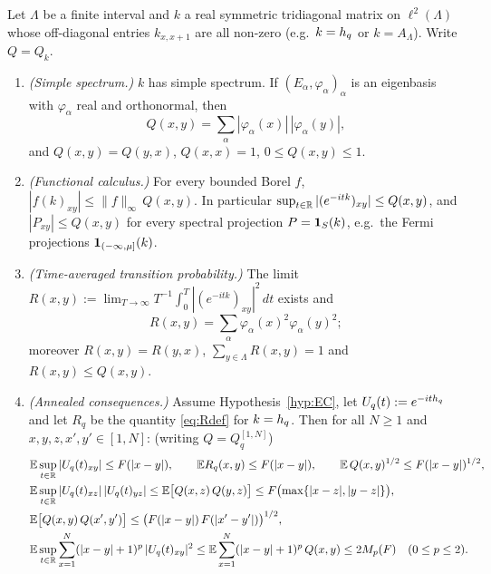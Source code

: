 \begin{lemma}\label{lem:consequences}
Let $\Lambda$ be a finite interval and $k$ a real symmetric tridiagonal matrix on $\ell^2(\Lambda)$ whose
off-diagonal entries $k_{x,x+1}$ are all non-zero (e.g.\ $k=h_{q}$ or $k=A_\Lambda$).  Write $Q=Q_k$.
\begin{enumerate}[label=(\alph*)]
\item \emph{(Simple spectrum.)} $k$ has simple spectrum.  If $(E_\alpha,\varphi_\alpha)_\alpha$ is an eigenbasis with
$\varphi_\alpha$ real and orthonormal, then
\begin{equation}\label{eq:Qsum}
  Q(x,y)=\sum_\alpha|\varphi_\alpha(x)|\,|\varphi_\alpha(y)| ,
\end{equation}
and $Q(x,y)=Q(y,x)$, $Q(x,x)=1$, $0\le Q(x,y)\le1$.
\item \emph{(Functional calculus.)} For every bounded Borel $f$, $|f(k)_{xy}|\le\|f\|_\infty\,Q(x,y)$.  In
particular $\sup_{t\in\mathbb{R}}|(e^{-itk})_{xy}|\le Q(x,y)$, and $|P_{xy}|\le Q(x,y)$ for every spectral
projection $P=\mathbf{1}_S(k)$, e.g.\ the Fermi projections $\mathbf{1}_{(-\infty,\mu]}(k)$.
\item \emph{(Time-averaged transition probability.)} The limit
$R(x,y):=\lim_{T\to\infty}T^{-1}\int_0^T|(e^{-itk})_{xy}|^2\,dt$ exists and
\begin{equation}\label{eq:Rdef}
  R(x,y)=\sum_\alpha\varphi_\alpha(x)^2\varphi_\alpha(y)^2 ;
\end{equation}
moreover $R(x,y)=R(y,x)$, $\sum_{y\in\Lambda}R(x,y)=1$ and $R(x,y)\le Q(x,y)$.
\item \emph{(Annealed consequences.)} Assume Hypothesis~\ref{hyp:EC}, let $U_q(t):=e^{-ith_{q}}$ and let
$R_q$ be the quantity \eqref{eq:Rdef} for $k=h_{q}$.  Then for all $N\ge1$ and $x,y,z,x',y'\in[1,N]$:
(writing $Q=Q^{[1,N]}_q$)
\begin{align}
  &\mathbb{E}\sup_{t\in\mathbb{R}}|U_q(t)_{xy}|\le F(|x-y|),\qquad \mathbb{E} R_q(x,y)\le F(|x-y|),\qquad
   \mathbb{E}\,Q(x,y)^{1/2}\le F(|x-y|)^{1/2},\label{eq:cons1}\\
  &\mathbb{E}\sup_{t\in\mathbb{R}}|U_q(t)_{xz}|\,|U_q(t)_{yz}|\le\mathbb{E}\bigl[Q(x,z)\,Q(y,z)\bigr]\le F\bigl(\max\{|x-z|,|y-z|\}\bigr),\label{eq:cons2}\\
  &\mathbb{E}\bigl[Q(x,y)\,Q(x',y')\bigr]\le\bigl(F(|x-y|)\,F(|x'-y'|)\bigr)^{1/2},\label{eq:cons3}\\
  &\mathbb{E}\sup_{t\in\mathbb{R}}\sum_{x=1}^N(|x-y|+1)^p\,|U_q(t)_{xy}|^2\le\mathbb{E}\sum_{x=1}^N(|x-y|+1)^p\,Q(x,y)\le2M_p(F)\quad(0\le p\le2).\label{eq:cons4}
\end{align}
\end{enumerate}
\end{lemma}

